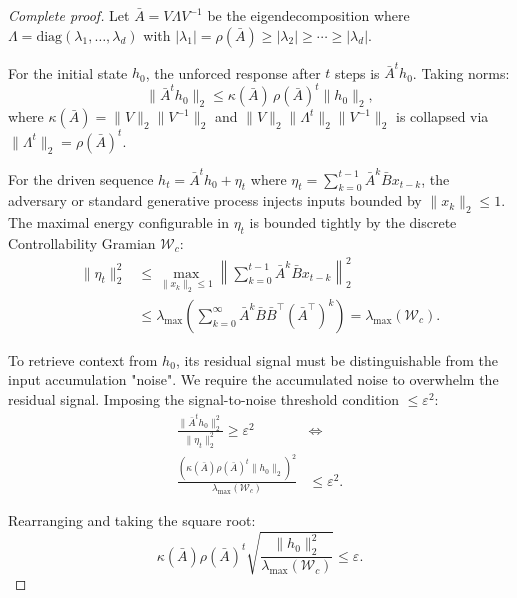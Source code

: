 \documentclass[10pt,twocolumn]{article}
\begin{document}
\begin{proof}[Complete proof]
Let $\bar{A} = V \Lambda V^{-1}$ be the eigendecomposition where $\Lambda = \text{diag}(\lambda_1, \dots, \lambda_d)$ with $|\lambda_1| = \rho(\bar{A}) \ge |\lambda_2| \ge \cdots \ge |\lambda_d|$. 

For the initial state $h_0$, the unforced response after $t$ steps is $\bar{A}^t h_0$. Taking norms:
\begin{equation}
\|\bar{A}^t h_0\|_2 \le \kappa(\bar{A})\, \rho(\bar{A})^t \|h_0\|_2,
\end{equation}
where $\kappa(\bar{A}) = \|V\|_2 \|V^{-1}\|_2$ and $\|V\|_2 \|\Lambda^t\|_2 \|V^{-1}\|_2$ is collapsed via $\|\Lambda^t\|_2 = \rho(\bar{A})^t$.

For the driven sequence $h_t = \bar{A}^t h_0 + \eta_t$ where $\eta_t = \sum_{k=0}^{t-1} \bar{A}^k \bar{B} x_{t-k}$, the adversary or standard generative process injects inputs bounded by $\|x_k\|_2 \le 1$. The maximal energy configurable in $\eta_t$ is bounded tightly by the discrete Controllability Gramian $\mathcal{W}_c$:
\begin{equation}
\begin{aligned}
\|\eta_t\|_2^2 &\le \max_{\|x_k\|_2 \le 1} \left\| \sum_{k=0}^{t-1} \bar{A}^k \bar{B} x_{t-k} \right\|_2^2 \\
&\le \lambda_{\max}\left( \sum_{k=0}^{\infty} \bar{A}^k \bar{B} \bar{B}^\top (\bar{A}^\top)^k \right) = \lambda_{\max}(\mathcal{W}_c).
\end{aligned}
\end{equation}

To retrieve context from $h_0$, its residual signal must be distinguishable from the input accumulation "noise". We require the accumulated noise to overwhelm the residual signal. Imposing the signal-to-noise threshold condition $\le \varepsilon^2$:
\begin{equation}
\begin{aligned}
\frac{\|\bar{A}^t h_0\|_2^2}{\|\eta_t\|_2^2} \ge \varepsilon^2 &\iff \\
\frac{(\kappa(\bar{A}) \rho(\bar{A})^t \|h_0\|_2)^2}{\lambda_{\max}(\mathcal{W}_c)} &\le \varepsilon^2.
\end{aligned}
\end{equation}

Rearranging and taking the square root:
\begin{equation}
\kappa(\bar{A}) \rho(\bar{A})^t \sqrt{ \frac{\|h_0\|_2^2}{\lambda_{\max}(\mathcal{W}_c)} } \le \varepsilon.
\end{equation}


\end{proof}
\end{document}
